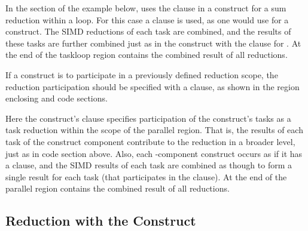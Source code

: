 In the  section of the example below,
 uses the  clause 
in a  construct for a sum reduction within a loop.
For this case a  clause is used, as one would use 
for a  construct.
The SIMD reductions of each task are combined, and the results of these tasks are further 
combined just as in the  construct with the  clause for .
At the end of the taskloop region  contains the combined result of all reductions.

If a  construct is to participate in a previously defined 
reduction scope, the reduction participation should be specified with
a  clause, as shown in the  region enclosing
 and  code sections.  

Here the  construct's 
 clause specifies participation of the construct's tasks as 
a task reduction within the scope of the parallel region.  
That is, the results of each task of the  construct component 
contribute to the reduction in a broader level, just as in  code section above.
Also, each -component construct
occurs as if it has a  clause, and the
SIMD results of each task are combined as though to form a single result for
each task (that participates in the  clause).
At the end of the parallel region  contains the combined result of all reductions.






\subsection{Reduction with the  Construct}
\label{subsec:reduction_scope}

